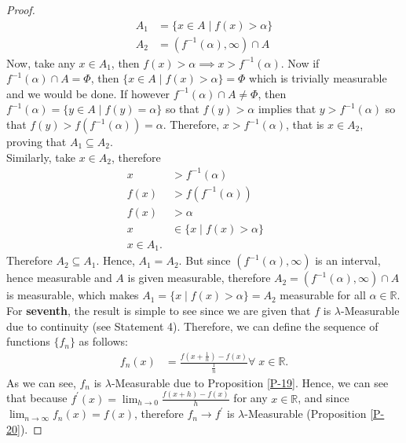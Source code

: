 \documentclass{article}
\theoremstyle{definition}
\theoremstyle{remark}
\theoremstyle{definition}
\theoremstyle{definition}
\theoremstyle{definition}
\newcommand{\intrs}{\cap}
\newcommand{\where}{\;\vert\;}
\newcommand{\R}{\mathbb{R}}
\newcommand{\inv}[1]{{#1}^{-1}}
\begin{document}
\begin{proof}
\begin{equation*}
	\begin{split}
		A_1 &= \{x\in A \where f(x) > \alpha\}\\
		A_2 &= \left (\inv{f}(\alpha),\infty\right ) \intrs A
	\end{split}
\end{equation*}
Now, take any $ x\in A_1 $, then $ f(x) > \alpha  \implies x > \inv{f}(\alpha)$. Now if $ \inv{f}(\alpha) \intrs A = \Phi $, then $ \{x\in A \where f(x) > \alpha\} = \Phi $ which is trivially measurable and we would be done. If however $ \inv{f}(\alpha) \intrs A \neq \Phi $, then $ \inv{f}(\alpha) = \{y\in A \where f(y) = \alpha\} $ so that $ f(y) > \alpha $ implies that $ y > \inv{f}(\alpha) $ so that $ f(y) > f(\inv{f}(\alpha))  = \alpha$. Therefore, $ x > \inv{f}(\alpha) $, that is $ x\in A_2 $, proving that $ A_1 \subseteq A_2 $. \\
Similarly, take $ x\in A_2 $, therefore 
\begin{align*}
	x &> \inv{f}(\alpha) &&\\
	f(x) &> f\left (\inv{f}(\alpha)\right )\\
	f(x) &> \alpha\\
	x&\in \{x\where f(x) > \alpha\}\\
	x\in A_1.
\end{align*}
Therefore $ A_2 \subseteq A_1 $. Hence, $ A_1 = A_2 $. But since $ \left (\inv{f}(\alpha),\infty\right ) $ is an interval, hence measurable and $ A $ is given measurable, therefore $ A_2 = \left (\inv{f}(\alpha),\infty\right ) \intrs A$ is measurable, which makes $ A_1 = \{x\where f(x) > \alpha\}= A_2$ measurable for all $ \alpha \in \R $.\\
For \textbf{seventh}, the result is simple to see since we are given that $ f $ is $ \lambda $-Measurable due to continuity (see Statement 4). Therefore, we can define the sequence of functions $ \{f_n\} $ as follows:
\begin{equation*}
	\begin{split}
		f_n(x) &= \frac{f\left (x + \frac{1}{n}\right ) - f(x)}{\frac{1}{n}} \forall\;x\in \R.
	\end{split}
\end{equation*}
As we can see, $ f_n $ is $ \lambda $-Measurable due to Proposition \ref{P-19}. Hence, we can see that because $ f^{\prime}(x) = \lim_{h\to 0}\frac{f(x+h)-f(x)}{h} $ for any $ x\in \R $, and since $ \lim_{n\to \infty} f_n(x) = f(x)$, therefore $ f_n \to f^\prime $ is $ \lambda $-Measurable (Proposition \ref{P-20}).
\end{proof}
\end{document}
